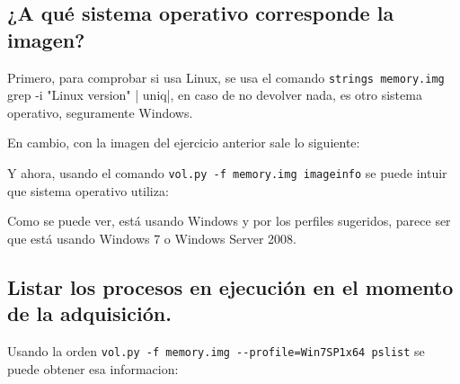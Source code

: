 \documentclass{article}
\begin{document}
\subsection{¿A qué sistema operativo corresponde la imagen?}

Primero, para comprobar si usa Linux, se usa el comando \verb|strings memory.img | grep -i "Linux version" | uniq|, en caso de no devolver nada, es otro sistema operativo, seguramente Windows.


En cambio, con la imagen del ejercicio anterior sale lo siguiente:



Y ahora, usando el comando \verb|vol.py -f memory.img imageinfo| se puede intuir que sistema operativo utiliza:


Como se puede ver, está usando Windows y por los perfiles sugeridos, parece ser que está usando Windows 7 o Windows Server 2008.

\subsection{Listar los procesos en ejecución en el momento de la adquisición.}

Usando la orden \verb|vol.py -f memory.img --profile=Win7SP1x64 pslist| se puede obtener esa informacion:

\end{document}
